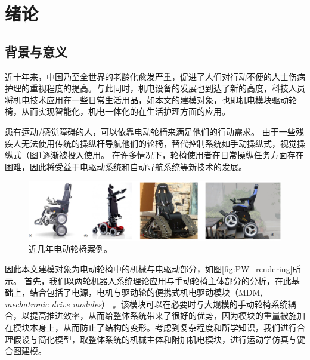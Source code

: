 \newpage
\setcounter{page}{1}
\cfoot{\thepage}

\section{绪论}
\subsection{背景与意义}

近十年来，中国乃至全世界的老龄化愈发严重，促进了人们对行动不便的人士伤病护理的重视程度的提高。与此同时，机电设备的发展也到达了新的高度，科技人员将机电技术应用在一些日常生活用品，如本文的建模对象，也即机电模块驱动轮椅，从而实现智能化，机电一体化的在生活护理方面的应用。

患有运动/感觉障碍的人，可以依靠电动轮椅来满足他们的行动需求。 由于一些残疾人无法使用传统的操纵杆导航他们的轮椅，替代控制系统如手动操纵式，视觉操纵式（图\ref{fig:smart_wheel_chairs}逐渐被投入使用。
在许多情况下，轮椅使用者在日常操纵任务方面存在困难，因此将受益于电驱动系统和自动导航系统等新技术的发展。

\begin{figure}[!h]
	\centering
	\includegraphics[width=1\textwidth]{fig/smart_wheel_chairs.png}
	\caption{近几年电动轮椅案例。}\label{fig:smart_wheel_chairs}
\end{figure}

因此本文建模对象为电动轮椅中的机械与电驱动部分，如图\ref{fig:PW_rendering}所示。
首先，我们以两轮机器人系统理论应用与手动轮椅主体部分的分析，在此基础上，结合包括了电源，电机与驱动轮的便携式机电驱动模块（MDM, \textit{mechatronic drive modules}） 。该模块可以在必要时与大规模的手动轮椅系统耦合，以提高推进效率，从而给整体系统带来了很好的优势，因为模块的重量被施加在模块本身上，从而防止了结构的变形。考虑到复杂程度和所学知识，我们进行合理假设与简化模型，取整体系统的机械主体和附加机电模块，进行运动学仿真与键合图建模。

